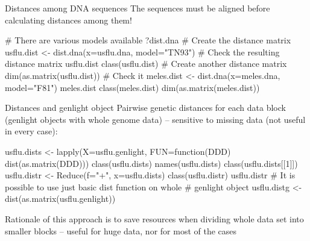 \documentclass[compress, ucs, xelatex, 11pt, xcolor=svgnames,
  hyperref={
    bookmarks=true,
    unicode=true,
    colorlinks=true,
    pdftitle={Molecular data in R},
    plainpages=false,
    pdfauthor={Vojtech Zeisek},
    pdfsubject={Course about phylogeny and evolution in R},
    pdfcreator={XeLaTeX},
    pdfkeywords={R, evolution, phylogeny, molecular data},
    linkcolor=Tomato,
    anchorcolor=SaddleBrown,
    citecolor=Goldenrod,
    filecolor=DarkMagenta,
    menucolor=Sienna,
    urlcolor=DarkTurquoise,
    pdftex},
  url={hyphens, lowtilde} %
  ]{beamer}
\begin{document}
\begin{frame}[fragile]{Distances among DNA sequences}
\alert{The sequences must be aligned before calculating distances among them!}
\vfill
  \begin{spluscode}
    # There are various models available
    ?dist.dna
    # Create the distance matrix
    usflu.dist <- dist.dna(x=usflu.dna, model="TN93")
    # Check the resulting distance matrix
    usflu.dist
    class(usflu.dist)
    # Create another distance matrix
    dim(as.matrix(usflu.dist))
    # Check it
    meles.dist <- dist.dna(x=meles.dna, model="F81")
    meles.dist
    class(meles.dist)
    dim(as.matrix(meles.dist))
  \end{spluscode}
\end{frame}

\begin{frame}[fragile]{Distances and genlight object}
Pairwise genetic distances for each data block (genlight objects with whole genome data) -- sensitive to missing data (not useful in every case):
\vfill
  \begin{spluscode}
    usflu.dists <- lapply(X=usflu.genlight, FUN=function(DDD)
      dist(as.matrix(DDD)))
    class(usflu.dists)
    names(usflu.dists)
    class(usflu.dists[[1]])
    usflu.distr <- Reduce(f="+", x=usflu.dists)
    class(usflu.distr)
    usflu.distr
    # It is possible to use just basic dist function on whole
    # genlight object
    usflu.distg <- dist(as.matrix(usflu.genlight))
  \end{spluscode}
\vfill
Rationale of this approach is to save resources when dividing whole data set into smaller blocks -- useful for huge data, nor for most of the cases
\end{frame}
\end{document}
